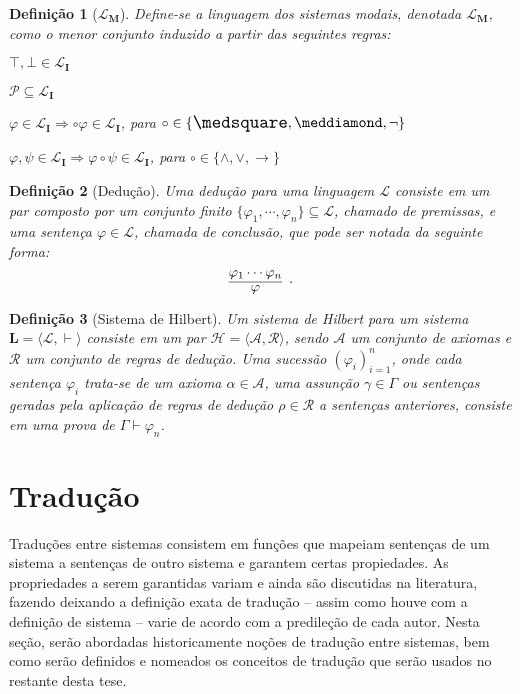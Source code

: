 \documentclass{report}
\newtheorem{definition}{Definição}
\begin{document}
    \begin{definition}[$\mathcal{L}_\mathbf{M}$]
        Define-se a linguagem dos sistemas modais, denotada $\mathcal{L}_\mathbf{M}$, como o menor conjunto induzido a partir das seguintes regras:
        
        $\top, \bot \in \mathcal{L}_\mathbf{I}$
        
        $\mathcal{P} \subseteq \mathcal{L}_\mathbf{I}$
        
        $\varphi \in \mathcal{L}_\mathbf{I} \Rightarrow \circ \varphi \in \mathcal{L}_\mathbf{I}$, para $\circ \in \{\nec, \pos, \neg\}$

        $\varphi, \psi \in \mathcal{L}_\mathbf{I} \Rightarrow \varphi \circ \psi \in \mathcal{L}_\mathbf{I}$, para $\circ \in \{\wedge, \vee, \to\}$
    \end{definition}

    \begin{definition}[Dedução]
        Uma dedução para uma linguagem $\mathcal{L}$ consiste em um par composto por um conjunto finito $\{\varphi_1, \cdots, \varphi_n\} \subseteq \mathcal{L}$, chamado de \emph{premissas}, e uma sentença $\varphi \in \mathcal{L}$, chamada de \emph{conclusão}, que pode ser notada da seguinte forma: $$\infer[.]{\varphi}{\varphi_1 \cdots \varphi_n}$$
    \end{definition}

    \begin{definition}[Sistema de Hilbert]
        Um sistema de Hilbert para um sistema $\mathbf{L} = \langle \mathcal{L}, \vdash\rangle$ consiste em um par $\mathcal{H} = \langle \mathcal{A}, \mathcal{R} \rangle$, sendo $\mathcal{A}$ um conjunto de axiomas e $\mathcal{R}$ um conjunto de regras de dedução. Uma sucessão $(\varphi_i)_{i=1}^n$, onde cada sentença $\varphi_i$ trata-se de um axioma $\alpha \in \mathcal{A}$, uma assunção $\gamma \in \Gamma$ ou sentenças geradas pela aplicação de regras de dedução $\rho \in \mathcal{R}$ a sentenças anteriores, consiste em uma prova de $\Gamma \vdash \varphi_n$.
    \end{definition}

    \section{Tradução}

    Traduções entre sistemas consistem em funções que mapeiam sentenças de um sistema a sentenças de outro sistema e garantem certas propiedades. As propriedades a serem garantidas variam e ainda são discutidas na literatura, fazendo deixando a definição exata de tradução -- assim como houve com a definição de sistema -- varie de acordo com a predileção de cada autor. Nesta seção, serão abordadas historicamente noções de tradução entre sistemas, bem como serão definidos e nomeados os conceitos de tradução que serão usados no restante desta tese.
\end{document}
